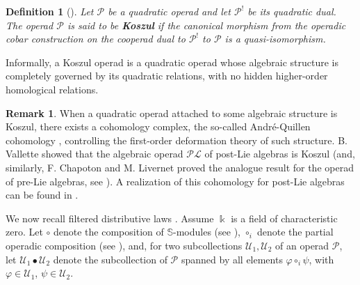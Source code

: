 \documentclass[10pt]{article}
\newtheorem {definition}[lemma] {Definition}
\theoremstyle{definition}
\newtheorem{remark}[lemma]{Remark}
\begin{document}
\begin{definition}[{\cite[Definition 3.40]{MSS}}]
Let $\mathcal P$ be a quadratic operad and let $\mathcal P^!$ be its
quadratic dual. The operad $\mathcal P$ is said to be
\textbf{Koszul} if the canonical morphism from the operadic cobar
construction on the cooperad dual to $\mathcal P^!$ to $\mathcal P$
is a quasi-isomorphism.
\end{definition}
Informally, a Koszul operad is a quadratic operad whose algebraic
structure is completely governed by its quadratic relations, with no
hidden higher-order homological relations.
\begin{remark}
When a quadratic operad attached to some algebraic structure is Koszul, there exists a cohomology complex, the so-called Andr\'e-Quillen cohomology \cite{Milles}, controlling the first-order deformation theory of such structure. B. Vallette \cite{Vallette} showed that the algebraic operad $\mathcal{PL}$ of post-Lie algebras is Koszul (and, similarly, F. Chapoton and M. Livernet proved the analogue result for the operad of pre-Lie algebras, see \cite{CL}). A realization of this cohomology for post-Lie algebras can be found in \cite{LazST}.
\end{remark}
We now recall filtered distributive laws \cite{DG}. 
Assume $\Bbbk$ is a field of characteristic zero. Let $\circ$ denote the composition of $\mathbb{S}$-modules (see \cite[5.1.4]{LodayVallette}), $\circ_i$ denote the partial operadic composition (see \cite[5.3.4]{LodayVallette}), and, for two subcollections $\mathcal{U}_1, \mathcal{U}_2$ of an operad $\mathcal{P}$, let  $\mathcal{U}_1 \bullet \mathcal{U}_2$ denote the subcollection of $\mathcal{P}$ spanned by all elements $\varphi \circ_i \psi$, with $\varphi \in \mathcal{U}_1$, $\psi \in \mathcal{U}_2$.
\end{document}
